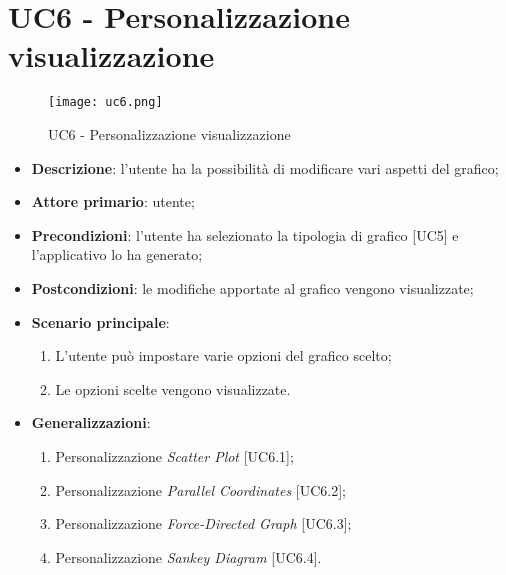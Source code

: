 \section{UC6 - Personalizzazione visualizzazione}
\begin{figure}[H]
  \centering
  \texttt{[image: uc6.png]}
  \caption{UC6 - Personalizzazione visualizzazione}
\end{figure}

\begin{itemize}
  \item \textbf{Descrizione}: l'utente ha la possibilità di modificare vari aspetti del grafico;
  \item \textbf{Attore primario}: utente;
  \item \textbf{Precondizioni}: l'utente ha selezionato la tipologia di grafico [UC5] e l'applicativo lo ha generato;
  \item \textbf{Postcondizioni}: le modifiche apportate al grafico vengono visualizzate;
  \item \textbf{Scenario principale}:
   \begin{enumerate}
    \item L'utente può impostare varie opzioni del grafico scelto;
    \item Le opzioni scelte vengono visualizzate.
  \end{enumerate}
  \item \textbf{Generalizzazioni}:
    \begin{enumerate}
      \item Personalizzazione \textit{Scatter Plot} [UC6.1];
      \item Personalizzazione \textit{Parallel Coordinates} [UC6.2];
      \item Personalizzazione \textit{Force-Directed Graph} [UC6.3];
      \item Personalizzazione \textit{Sankey Diagram} [UC6.4].
    \end{enumerate}
\end{itemize}

